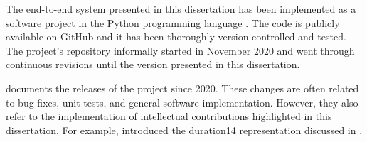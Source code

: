
The end-to-end system presented in this dissertation has
been implemented as a software project in the Python
programming language \parencite{vanrossum2007python}. The
code is publicly available on GitHub and it has been
thoroughly version controlled and tested. The project's
repository informally started in November 2020 and went
through continuous revisions until the version presented in
this dissertation.

 documents the releases of the project
since 2020. These changes are often related to bug fixes,
unit tests, and general software implementation. However,
they also refer to the implementation of intellectual
contributions highlighted in this dissertation. For example,
 introduced the \gls{duration14} representation
discussed in .
